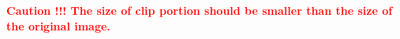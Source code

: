 \documentclass[11pt]{article}
\begin{document}
\textcolor{red}{\bf{Caution !!!} The size of clip portion should be smaller than the size of the original image.}
%
%
%
%
% 
%
%
%

 
 


 
 
\end{document}
